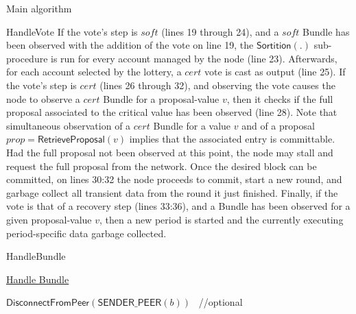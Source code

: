 \documentclass[10pt,a4paper]{article}
\begin{document}
\begin{section}{Main algorithm}
\begin{subsection}{HandleVote}
If the vote's step is $soft$ (lines 19 through 24), and a $soft$ Bundle has been observed with the addition of the vote on line 19,
the $\mathsf{Sortition}(.)$ sub-procedure is run for every account managed by the node (line 23). Afterwards, for each account selected by
the lottery, a $cert$ vote is cast as output (line 25).
If the vote's step is $cert$ (lines 26 through 32), and observing the vote causes the node to observe a $cert$ Bundle for a proposal-value $v$,
then it checks if the full proposal associated to the critical value has been observed (line 28). Note that simultaneous observation of a $cert$ Bundle 
for a value $v$ and of a proposal $prop = \mathsf{RetrieveProposal}(v)$ implies that the associated entry is committable.
Had the full proposal not been observed at this point, the node may stall and request the full proposal from the network.
Once the desired block can be committed, on lines 30:32 the node proceeds to commit, start a new round, and garbage collect all
transient data from the round it just finished.
Finally, if the vote is that of a recovery step (lines 33:36), and a Bundle has been observed for a given proposal-value $v$,
then a new period is started and the currently executing period-specific data garbage collected.



\end{subsection}


\begin{subsection}{HandleBundle}\label{ssect:HandleBundle}

    \begin{algorithm}[H]
        \caption{\underline{Handle Bundle}}
        \label{algo:handle-bundle}
        \begin{algorithmic}[1]



                \State $\mathsf{DisconnectFromPeer}(\mathsf{SENDER\_PEER}(b))$ \ //optional
                \Return
            \EndIf


\end{algorithmic}
\end{algorithm}
\end{subsection}
\end{section}
\end{document}
